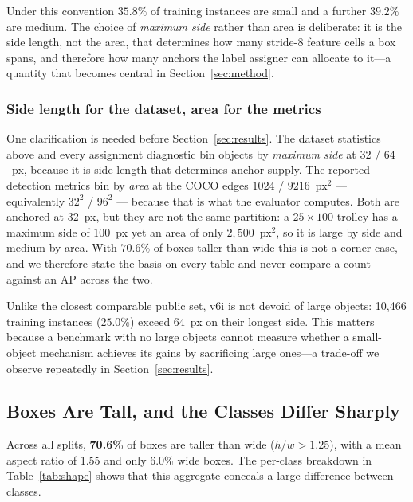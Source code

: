 \documentclass[10pt,twocolumn,a4paper]{article}
\begin{document}
Under this convention $35.8\%$ of training instances are small and a further
$39.2\%$ are medium. The choice
of \emph{maximum side} rather than area is deliberate: it is the side length, not
the area, that determines how many stride-8 feature cells a box spans, and
therefore how many anchors the label assigner can allocate to it---a quantity that
becomes central in Section~\ref{sec:method}.

\subsubsection*{Side length for the dataset, area for the metrics}

One clarification is needed before Section~\ref{sec:results}. The dataset
statistics above and every assignment diagnostic bin objects by \emph{maximum
side} at $32$ / $64$~px, because it is side length that determines anchor
supply. The reported detection metrics bin by \emph{area} at the COCO \cite{lin2014coco} edges
$1024$ / $9216$~px$^2$ --- equivalently $32^2$ / $96^2$ --- because that is what
the evaluator computes. Both are anchored at $32$~px, but they are not the same
partition: a $25\times100$ trolley has a maximum side of $100$~px yet an area of
only $2{,}500$~px$^2$, so it is large by side and medium by area. With $70.6\%$
of boxes taller than wide this is not a corner case, and we therefore state the
basis on every table and never compare a count against an AP across the two.

Unlike the closest comparable public set, v6i is not devoid of large objects:
10{,}466 training instances ($25.0\%$) exceed $64$~px on their longest side. This
matters because a benchmark with no large objects cannot measure whether a
small-object mechanism achieves its gains by sacrificing large ones---a trade-off
we observe repeatedly in Section~\ref{sec:results}.

\subsection{Boxes Are Tall, and the Classes Differ Sharply}

Across all splits, \textbf{70.6\%} of boxes are taller than wide
($h/w>1.25$), with a mean aspect ratio of 1.55 and only 6.0\% wide boxes. The
per-class breakdown in Table~\ref{tab:shape} shows that this aggregate conceals a
large difference between classes.
\end{document}
